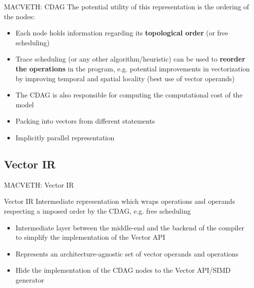 \documentclass[xcolor=table,hideothersubsections,aspectratio=1610]{beamer}
\begin{document}
\begin{frame}{MACVETH: CDAG}
The potential utility of this representation is the ordering of the nodes:
\begin{itemize}
    \item Each node holds information regarding its \textbf{topological order} (or free scheduling)
    \item Trace scheduling (or any other algorithm/heuristic) can be used to \textbf{reorder the operations} in the program, e.g. potential improvements in vectorization by improving temporal and spatial locality (best use of vector operands)
    \item The CDAG is also responsible for computing the computational cost of the model
    \item Packing into vectors from different statements
    \item Implicitly parallel representation
\end{itemize}
\end{frame}

\subsection{Vector IR}
\begin{frame}{MACVETH: Vector IR}
\begin{block}{Vector IR}
Intermediate representation which wraps operations and operands respecting a imposed order by the CDAG, e.g. free scheduling
\end{block}

\begin{itemize}
    \item Intermediate layer between the middle-end and the backend of the compiler to simplify the implementation of the Vector API
    \item Represents an architecture-agnostic set of vector operands and operations
    \item Hide the implementation of the CDAG nodes to the Vector API/SIMD generator
\end{itemize}

\end{frame}
\end{document}
